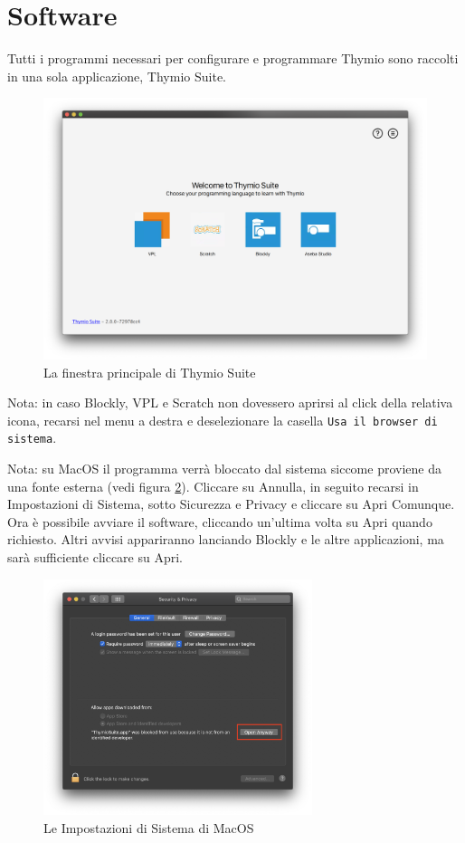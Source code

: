 \documentclass[12pt]{article}
\begin{document}
\newpage

\section{Software}

	Tutti i programmi necessari per configurare e programmare Thymio sono raccolti in una sola applicazione, Thymio Suite.
	
	\begin{figure}[H]
		\includegraphics[width=\textwidth]{img/thymioSuite.png}
		\caption{La finestra principale di Thymio Suite}
		\label{aseba1}
	\end{figure}
	
	Nota: in caso Blockly, VPL e Scratch non dovessero aprirsi al click della relativa icona, recarsi nel menu a destra e deselezionare la casella \texttt{Usa il browser di sistema}.
	
	\newpage
	
	Nota: su MacOS il programma verrà bloccato dal sistema siccome proviene da una fonte esterna (vedi figura \ref{macErr}). Cliccare su Annulla, in seguito recarsi in Impostazioni di Sistema, sotto Sicurezza e Privacy e cliccare su Apri Comunque. Ora è possibile avviare il software, cliccando un'ultima volta su Apri quando richiesto. Altri avvisi appariranno lanciando Blockly e le altre applicazioni, ma sarà sufficiente cliccare su Apri.
		
	\begin{figure}[H]
		\centering
			\includegraphics[width=0.7\textwidth]{img/macWarn.png}
			\caption{Le Impostazioni di Sistema di MacOS}
			\label{macErr}
	\end{figure}
	
\end{document}
